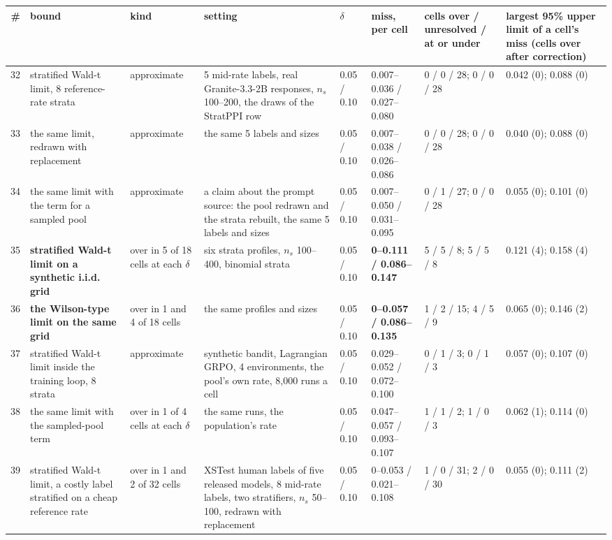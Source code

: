 \begin{tabular}{@{}r p{2.8cm} p{2.0cm} p{3.9cm} l p{2.1cm} p{2.0cm} p{1.9cm}@{}}
\toprule
\textbf{\#} & \textbf{bound} & \textbf{kind} & \textbf{setting} & \textbf{$\delta$} & \textbf{miss, per cell} & \textbf{cells over / unresolved / at or under} & \textbf{largest 95\% upper limit of a cell's miss (cells over after correction)} \\
\midrule
32 & stratified Wald-t limit, 8 reference-rate strata & approximate & 5 mid-rate labels, real Granite-3.3-2B responses, $n_s$ 100--200, the draws of the StratPPI row & 0.05 / 0.10 & 0.007--0.036 / 0.027--0.080 & 0 / 0 / 28; 0 / 0 / 28 & 0.042 (0); 0.088 (0) \\
33 & the same limit, redrawn with replacement & approximate & the same 5 labels and sizes & 0.05 / 0.10 & 0.007--0.038 / 0.026--0.086 & 0 / 0 / 28; 0 / 0 / 28 & 0.040 (0); 0.088 (0) \\
34 & the same limit with the term for a sampled pool & approximate & a claim about the prompt source: the pool redrawn and the strata rebuilt, the same 5 labels and sizes & 0.05 / 0.10 & 0.007--0.050 / 0.031--0.095 & 0 / 1 / 27; 0 / 0 / 28 & 0.055 (0); 0.101 (0) \\
35 & \textbf{stratified Wald-t limit on a synthetic i.i.d. grid} & over in 5 of 18 cells at each $\delta$ & six strata profiles, $n_s$ 100--400, binomial strata & 0.05 / 0.10 & \textbf{0--0.111 / 0.086--0.147} & 5 / 5 / 8; 5 / 5 / 8 & 0.121 (4); 0.158 (4) \\
36 & \textbf{the Wilson-type limit on the same grid} & over in 1 and 4 of 18 cells & the same profiles and sizes & 0.05 / 0.10 & \textbf{0--0.057 / 0.086--0.135} & 1 / 2 / 15; 4 / 5 / 9 & 0.065 (0); 0.146 (2) \\
37 & stratified Wald-t limit inside the training loop, 8 strata & approximate & synthetic bandit, Lagrangian GRPO, 4 environments, the pool's own rate, 8,000 runs a cell & 0.05 / 0.10 & 0.029--0.052 / 0.072--0.100 & 0 / 1 / 3; 0 / 1 / 3 & 0.057 (0); 0.107 (0) \\
38 & the same limit with the sampled-pool term & over in 1 of 4 cells at each $\delta$ & the same runs, the population's rate & 0.05 / 0.10 & 0.047--0.057 / 0.093--0.107 & 1 / 1 / 2; 1 / 0 / 3 & 0.062 (1); 0.114 (0) \\
39 & stratified Wald-t limit, a costly label stratified on a cheap reference rate & over in 1 and 2 of 32 cells & XSTest human labels of five released models, 8 mid-rate labels, two stratifiers, $n_s$ 50--100, redrawn with replacement & 0.05 / 0.10 & 0--0.053 / 0.021--0.108 & 1 / 0 / 31; 2 / 0 / 30 & 0.055 (0); 0.111 (2) \\

\end{tabular}
